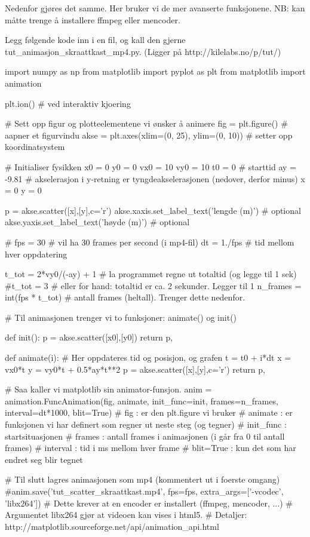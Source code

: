Nedenfor gjøres det samme. Her bruker vi de mer avanserte funksjonene. NB: kan måtte trenge å installere ffmpeg eller mencoder. 

Legg følgende kode inn i en fil, og kall den gjerne tut\_{}animasjon\_{}skraattkast\_{}mp4.py. (Ligger på http://kilelabs.no/p/tut/)

\begin{usncodebox}
import numpy as np
from matplotlib import pyplot as plt
from matplotlib import animation

plt.ion()   # ved interaktiv kjoering 

# Sett opp figur og plotteelementene vi ønsker å animere
fig = plt.figure()                           # aapner et figurvindu
akse = plt.axes(xlim=(0, 25), ylim=(0, 10))  # setter opp koordinatsystem

# Initialiser fysikken
x0  = 0
y0  = 0
vx0 = 10
vy0 = 10
t0  = 0      # starttid
ay  = -9.81  # akselerasjon i y-retning er tyngdeakselerasjonen (nedover, derfor minus)
x   = 0
y   = 0

p = akse.scatter([x],[y],c='r')
akse.xaxis.set_label_text('lengde (m)')  # optional
akse.yaxis.set_label_text('høyde (m)')   # optional

# 
fps = 30      # vil ha 30 frames per second (i mp4-fil)
dt = 1./fps   # tid mellom hver oppdatering 

t_tot = 2*vy0/(-ay) + 1      # la programmet regne ut totaltid (og legge til 1 sek)
#t_tot = 3                   # eller for hand: totaltid er ca. 2 sekunder. Legger til 1
n_frames = int(fps * t_tot)  # antall frames (heltall). Trenger dette nedenfor. 



# Til animasjonen trenger vi to funksjoner: animate() og init() 

def init():
    p = akse.scatter([x0],[y0])
    return p,


def animate(i):
    # Her oppdateres tid og posisjon, og grafen
    t = t0 + i*dt
    x = vx0*t
    y = vy0*t + 0.5*ay*t**2
    p = akse.scatter([x],[y],c='r')
    return p,
    

# Saa kaller vi matplotlib sin animator-funsjon.  
anim = animation.FuncAnimation(fig, animate, init_func=init, frames=n_frames, interval=dt*1000, blit=True)
# fig       : er den plt.figure vi bruker
# animate   : er funksjonen vi har definert som regner ut neste steg (og tegner)
# init_func : startsituasjonen
# frames    : antall frames i animasjonen (i går fra 0 til antall frames)
# interval  : tid i ms mellom hver frame 
# blit=True : kun det som har endret seg blir tegnet 


# Til slutt lagres animasjonen som mp4 (kommentert ut i foerste omgang)
#anim.save('tut_scatter_skraattkast.mp4', fps=fps, extra_args=['-vcodec', 'libx264'])
# Dette krever at en encoder er installert (ffmpeg, mencoder, ...)
# Argumentet libx264 gjør at videoen kan vises i html5. 
# Detaljer:  http://matplotlib.sourceforge.net/api/animation_api.html
\end{usncodebox}

